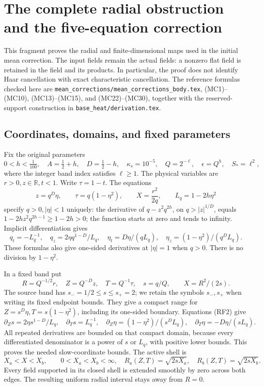 \documentclass[10pt,a4paper]{article}
\begin{document}
\section{The complete radial obstruction and the five-equation correction}
\label{si:sec:rf-audit}

This fragment proves the radial and finite-dimensional maps used in the
initial mean correction. The input fields remain the actual fields: a
nonzero flat field is retained in the field and its products. In particular,
the proof does not identify Haar cancellation with exact characteristic
cancellation. The reference formulas checked here are
\texttt{mean\_corrections/mean\_corrections\_body.tex}, (MC1)--(MC10),
(MC13)--(MC15), and (MC22)--(MC30), together with the reserved-support
construction in \texttt{base\_heat/derivation.tex}.

\subsection{Coordinates, domains, and fixed parameters}

Fix the original parameters
\[
0<h<\tfrac1{100},\quad A=\tfrac12+h,\quad D=\tfrac12-h,
\quad\kappa_s=10^{-5},\quad Q=2^{-\ell},\quad
\epsilon=Q^h,\quad S_*=\ell^2,
\]
where the integer band index satisfies \(\ell\ge1\). The physical variables
are \(r>0,z\in\mathbb R,t<1\). Write \(\tau=1-t\). The equations
\[
z=q^D\eta,\qquad \tau=q(1-\eta^2),\qquad
X=\frac{r^2}{2q},\qquad L_q=1-2h\eta^2
\tag{RF1}
\]
specify \(q>0,|\eta|<1\) uniquely: the derivative of
\(q-z^2q^{2h}\), on \(q>|z|^{1/D}\), equals
\(1-2hz^2q^{2h-1}\ge1-2h>0\); the function starts at zero and
tends to infinity. Implicit differentiation gives
\[
q_t=-L_q^{-1},\quad q_z=2\eta q^{1-D}/L_q,
\quad\eta_t=D\eta/(qL_q),\quad
\eta_z=(1-\eta^2)/(q^DL_q).
\tag{RF2}
\]
These formulas also give one-sided derivatives at \(|\eta|=1\) when
\(q>0\). There is no division by \(1-\eta^2\).

In a fixed band put
\[
R=Q^{-1/2}r,\quad Z=Q^{-D}z,\quad T=Q^{-1}\tau,
\quad s=q/Q,\qquad X=R^2/(2s).
\]
The source band has \(s_-=1/2\le s\le s_+=2\); we retain the
symbols \(s_-,s_+\) when writing its fixed endpoint bounds.
They give a compact range for \(Z=s^D\eta,T=s(1-\eta^2)\),
including its one-sided boundary. Equations (RF2) give
\[
\partial_Zs=2\eta s^{1-D}/L_q,\quad
\partial_Ts=L_q^{-1},\quad
\partial_Z\eta=(1-\eta^2)/(s^DL_q),\quad
\partial_T\eta=-D\eta/(sL_q).
\tag{RF3}
\]
All repeated derivatives are bounded on that compact domain, because
every differentiated denominator is a power of \(s\) or \(L_q\), with
positive lower bounds. This proves the needed slow-coordinate bounds.
The active shell is
\[
X_a<X<X_b,\qquad
0<X_a<X_b<\infty,
\quad R_a(Z,T)=\sqrt{2sX_a},\quad R_b(Z,T)=\sqrt{2sX_b}.
\tag{RF4}
\]
Every field supported in its closed shell is extended smoothly by zero
across both edges. The resulting uniform radial interval stays away from
\(R=0\).
\end{document}
